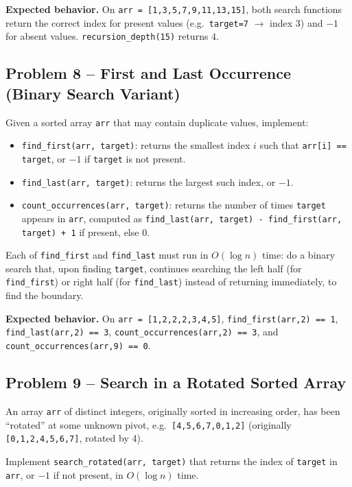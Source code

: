 \documentclass[11pt]{article}
\begin{document}
\textbf{Expected behavior.} On \texttt{arr = [1,3,5,7,9,11,13,15]}, both search functions
return the correct index for present values (e.g.\ \texttt{target=7} $\to$ index $3$) and
$-1$ for absent values. \texttt{recursion\_depth(15)} returns $4$.

\subsection*{Problem 8 -- First and Last Occurrence (Binary Search Variant)}

Given a sorted array \texttt{arr} that may contain duplicate values, implement:
\begin{itemize}
    \item \texttt{find\_first(arr, target)}: returns the smallest index $i$ such that
    \texttt{arr[i] == target}, or $-1$ if \texttt{target} is not present.
    \item \texttt{find\_last(arr, target)}: returns the largest such index, or $-1$.
    \item \texttt{count\_occurrences(arr, target)}: returns the number of times
    \texttt{target} appears in \texttt{arr}, computed as \texttt{find\_last(arr, target) -
    find\_first(arr, target) + 1} if present, else $0$.
\end{itemize}
Each of \texttt{find\_first} and \texttt{find\_last} must run in $O(\log n)$ time: do a
binary search that, upon finding \texttt{target}, continues searching the left half (for
\texttt{find\_first}) or right half (for \texttt{find\_last}) instead of returning
immediately, to find the boundary.

\textbf{Expected behavior.} On \texttt{arr = [1,2,2,2,3,4,5]}, \texttt{find\_first(arr,2)
== 1}, \texttt{find\_last(arr,2) == 3}, \texttt{count\_occurrences(arr,2) == 3}, and
\texttt{count\_occurrences(arr,9) == 0}.

\subsection*{Problem 9 -- Search in a Rotated Sorted Array}

An array \texttt{arr} of distinct integers, originally sorted in increasing order, has
been ``rotated'' at some unknown pivot, e.g.\ \texttt{[4,5,6,7,0,1,2]} (originally
\texttt{[0,1,2,4,5,6,7]}, rotated by 4).

Implement \texttt{search\_rotated(arr, target)} that returns the index of \texttt{target}
in \texttt{arr}, or $-1$ if not present, in $O(\log n)$ time.
\end{document}
